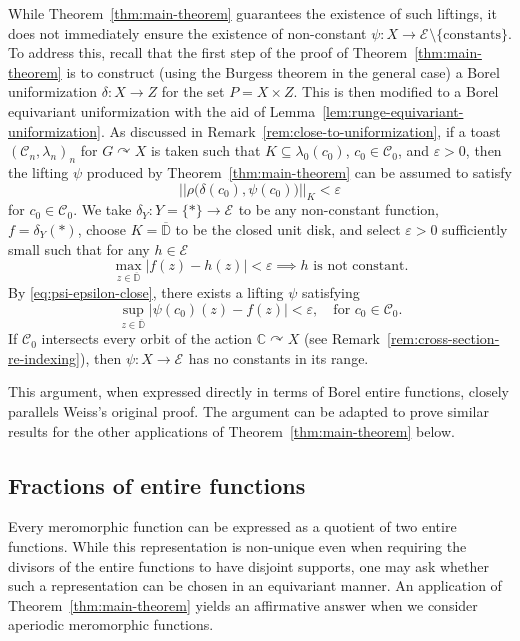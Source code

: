 \documentclass[12pt]{paper}
\numberwithin{equation}{section}
\theoremstyle{plain}
\theoremstyle{definition}
\newcommand{\C}{\mathbb{C}}
\renewcommand{\Dbar}{\overline{\mathbb{D}}}
\newcommand{\holom}[1][]{\mathcal{E}_{#1}}
\newcommand{\acts}{\curvearrowright}
\newcommand{\norm}[1]{||#1||}
\renewcommand{\epsilon}{\varepsilon}
\begin{document}
While Theorem~\ref{thm:main-theorem} guarantees the existence of such liftings, it does not
immediately ensure the existence of non-constant
\(\psi : X \to \holom \setminus \{\textrm{constants}\}\). To address this,
recall that the first step of the proof of Theorem~\ref{thm:main-theorem} is to construct
(using the Burgess theorem in the general case) a Borel uniformization \(\delta : X \to Z\)
for the set \(P = X\times Z\). This is then modified to a Borel equivariant uniformization
with the aid of Lemma~\ref{lem:runge-equivariant-uniformization}.
As discussed in Remark~\ref{rem:close-to-uniformization},
if a toast \((\mathcal{C}_n,\lambda_n)_{n}\) for \(G\acts X\) is taken such that
\(K \subseteq \lambda_{0}(c_{0})\), \(c_{0} \in \mathcal{C}_{0}\), and \(\epsilon > 0\), then the
lifting \(\psi\) produced by Theorem~\ref{thm:main-theorem} can be assumed to satisfy
\begin{equation}
\label{eq:psi-epsilon-close}
\norm{\rho\bigl(\delta(c_{0}), \psi(c_{0})\bigr)}_{K} < \epsilon
\end{equation}
for \(c_{0} \in \mathcal{C}_{0}\). We take \(\delta_{Y} : Y = \{*\} \to \holom\) to be any
non-constant function, \(f = \delta_{Y}(*)\), choose \(K = \Dbar\) to be the closed unit disk, and
select \(\epsilon > 0\) sufficiently small such that for any \(h \in \holom\)
\[\max_{z \in \Dbar}|f(z) - h(z)| < \epsilon \implies h \textrm{ is not constant}.\]
By \eqref{eq:psi-epsilon-close}, there exists a lifting \(\psi\) satisfying
\[
  \sup_{z \in \Dbar}|\psi(c_{0})(z) - f(z)| < \epsilon, \quad \textrm{for } c_{0} \in \mathcal{C}_{0}.
\]
If \(\mathcal{C}_{0}\) intersects every orbit of the action \(\C \acts X\) (see
Remark~\ref{rem:cross-section-re-indexing}), then \(\psi : X \to \holom\) has no constants in its
range.

This argument, when expressed directly in terms of Borel entire functions, closely parallels
Weiss's original proof. The argument can be adapted to prove similar results for the other applications
of Theorem~\ref{thm:main-theorem} below.



\subsection{Fractions of entire functions}
\label{sec:fract-entire-funct}

Every meromorphic function can be expressed as a quotient of two entire functions. While this
representation is non-unique even when requiring the divisors of the entire functions to have
disjoint supports, one may ask whether such a representation can be chosen in an equivariant
manner. An application of Theorem~\ref{thm:main-theorem} yields an affirmative answer when we
consider aperiodic meromorphic functions.
\end{document}
